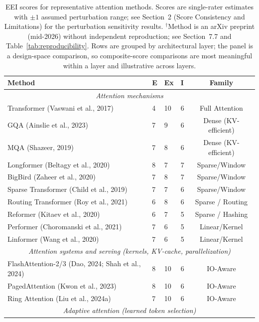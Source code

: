 \documentclass[10pt,twocolumn]{article}
\newif\ifshrinkfloats
\newcommand{\sflt}[2]{\ifshrinkfloats#1\else#2\fi}
\begin{document}
\begin{table}[!tbp]
\centering
\sflt{\fontsize{8.32}{10}\selectfont}{\footnotesize}
\renewcommand{\arraystretch}{\sflt{0.95}{1.1}}
\caption{EEI scores for representative attention methods. Scores are single-rater estimates with $\pm1$ assumed perturbation range; see Section~2 (Score Consistency and Limitations) for the perturbation sensitivity results. $^\dagger$Method is an arXiv preprint (mid-2026) without independent reproduction; see Section~7.7 and Table~\ref{tab:reproducibility}. Rows are grouped by architectural layer; the panel is a design-space comparison, so composite-score comparisons are most meaningful within a layer and illustrative across layers.}
\label{tab:eei-scores}
\begin{tabular}{p{2.5cm}p{1.2cm}p{1.5cm}p{1.5cm}c}
\toprule
Method & E & Ex & I & Family \\
\midrule
\multicolumn{5}{c}{\emph{Attention mechanisms}} \\
Transformer (Vaswani et al., 2017) & 4 & 10 & 6 & Full Attention \\
GQA (Ainslie et al., 2023) & 7 & 9 & 6 & Dense (KV-efficient) \\
MQA (Shazeer, 2019) & 7 & 8 & 6 & Dense (KV-efficient) \\
Longformer (Beltagy et al., 2020) & 8 & 7 & 7 & Sparse/Window \\
BigBird (Zaheer et al., 2020) & 7 & 8 & 7 & Sparse/Window \\
Sparse Transformer (Child et al., 2019) & 7 & 7 & 6 & Sparse/Window \\
Routing Transformer (Roy et al., 2021) & 6 & 8 & 6 & Sparse / Routing \\
Reformer (Kitaev et al., 2020) & 6 & 7 & 5 & Sparse / Hashing \\
Performer (Choromanski et al., 2021) & 7 & 6 & 5 & Linear/Kernel \\
Linformer (Wang et al., 2020) & 7 & 6 & 5 & Linear/Kernel \\
\midrule
\multicolumn{5}{c}{\emph{Attention systems and serving (kernels, KV-cache, parallelization)}} \\
FlashAttention-2/3 (Dao, 2024; Shah et al., 2024) & 8 & 10 & 6 & IO-Aware \\
PagedAttention (Kwon et al., 2023) & 8 & 10 & 6 & IO-Aware \\
Ring Attention (Liu et al., 2024a) & 7 & 10 & 6 & IO-Aware \\
\midrule
\multicolumn{5}{c}{\emph{Adaptive attention (learned token selection)}} \\

\end{tabular}
\end{table}
\end{document}
